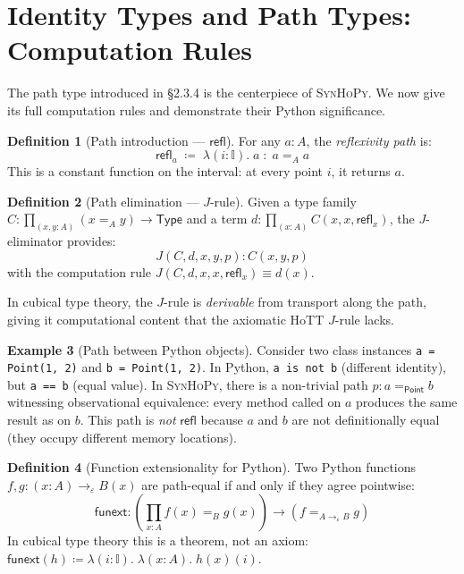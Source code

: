 \documentclass[11pt,a4paper]{report}
\theoremstyle{definition}
\newtheorem{definition}{Definition}[chapter]
\newtheorem{example}[definition]{Example}
\theoremstyle{plain}
\newcommand{\Type}{\mathsf{Type}}
\newcommand{\interval}{\mathbb{I}}
\newcommand{\Refl}{\mathsf{refl}}
\newcommand{\defeq}{\coloneqq}
\newcommand{\synhopy}{\textsc{SynHoPy}}
\begin{document}
\section{Identity Types and Path Types: Computation Rules}

The path type introduced in \S2.3.4 is the centerpiece of \synhopy{}.  We now
give its full computation rules and demonstrate their Python significance.

\begin{definition}[Path introduction --- $\Refl$]
For any $a : A$, the \emph{reflexivity path} is:
\[
  \Refl_a \;\defeq\; \lambda(i : \interval).\; a \;:\; a =_A a
\]
This is a constant function on the interval: at every point $i$, it returns $a$.
\end{definition}

\begin{definition}[Path elimination --- $J$-rule]
Given a type family $C : \prod_{(x,y:A)} (x =_A y) \to \Type$ and a term
$d : \prod_{(x:A)} C(x, x, \Refl_x)$, the $J$-eliminator provides:
\[
  J(C, d, x, y, p) : C(x, y, p)
\]
with the computation rule $J(C, d, x, x, \Refl_x) \equiv d(x)$.
\end{definition}

In cubical type theory, the $J$-rule is \emph{derivable} from transport along
the path, giving it computational content that the axiomatic HoTT $J$-rule
lacks.

\begin{example}[Path between Python objects]
Consider two class instances \lstinline[style=python]{a = Point(1, 2)} and
\lstinline[style=python]{b = Point(1, 2)}.  In Python, \lstinline[style=python]{a is not b}
(different identity), but \lstinline[style=python]{a == b} (equal value).
In \synhopy{}, there is a non-trivial path $p : a =_{\mathsf{Point}} b$
witnessing observational equivalence: every method called on $a$ produces
the same result as on $b$.  This path is \emph{not} $\Refl$ because $a$ and
$b$ are not definitionally equal (they occupy different memory locations).
\end{example}

\begin{definition}[Function extensionality for Python]
\label{def:funext}
Two Python functions $f, g : (x : A) \to_\varepsilon B(x)$ are path-equal
if and only if they agree pointwise:
\[
  \mathsf{funext} : \left(\prod_{x : A} f(x) =_B g(x)\right) \to (f =_{A \to_\varepsilon B} g)
\]
In cubical type theory this is a theorem, not an axiom:
$\mathsf{funext}(h) \defeq \lambda(i : \interval).\;\lambda(x : A).\; h(x)(i)$.
\end{definition}
\end{document}
